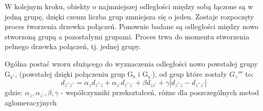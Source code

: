 \documentclass[12pt,a4paper]{report}
\begin{document}
W kolejnym kroku, obiekty o najmniejszej odległości między sobą łączone są w jedną grupę, dzięki czemu liczba grup zmniejsza się o jeden. Zostaje rozpoczęty proces tworzenia drzewka połączeń. Ponownie badane są odległości między nowo stworzoną grupą a pozostałymi grupami. Proces trwa do momentu stworzenia pełnego drzewka połączeń, tj. jednej grupy. 


Ogólna postać wzoru służącego do wyznaczenia odległości nowo powstałej grupy $\mathrm{G_{z^{''}}}$, (powstałej dzięki połączeniu grup $\mathrm{G_{z}}$ i $\mathrm{G_{z^{'}}}$), od grup które zostały ${G_z{'''}}$ to:
$$
d_{z^{'''}z^{''}}=\alpha_{z}d_{z^{'''}z} + \alpha_{z^{'}}d_{z^{'''}z^{'}} + \beta d_{zz^{'}} + \gamma|d_{z^{'''}z} - d_{z^{'''}z^{'}}| 
$$
gdzie:
$\alpha_{z},\alpha_{z^{'}}, \beta, \gamma$ - współczynniki przekształceń, różne dla poszczególnych metod aglomeracyjnych
\end{document}
